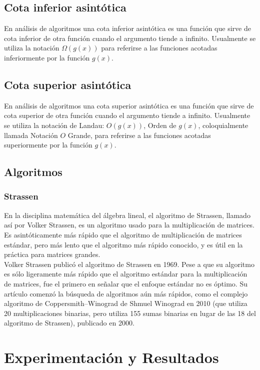 \documentclass[a4paper]{article}
\begin{document}
\subsection{Cota inferior asintótica}
En análisis de algoritmos una cota inferior asintótica es una función que sirve de cota inferior de otra función cuando el argumento tiende a infinito. Usualmente se utiliza la notación $\Omega(g(x))$ para referirse a las funciones acotadas inferiormente por la función $g(x)$.\cite{cota}

\subsection{Cota superior asintótica}
En análisis de algoritmos una cota superior asintótica es una función que sirve de cota superior de otra función cuando el argumento tiende a infinito. Usualmente se utiliza la notación de Landau: $O(g(x))$, Orden de $g(x)$, coloquialmente llamada Notación $O$ Grande, para referirse a las funciones acotadas superiormente por la función $g(x)$.\cite{cota}

\subsection{Algoritmos} 
\subsubsection{Strassen}
En la disciplina matemática del álgebra lineal, el algoritmo de Strassen, llamado así por Volker Strassen, es un algoritmo usado para la multiplicación de matrices. Es asintóticamente más rápido que el algoritmo de multiplicación de matrices estándar, pero más lento que el algoritmo más rápido conocido, y es útil en la práctica para matrices grandes.
\\
Volker Strassen publicó el algoritmo de Strassen en 1969. Pese a que su algoritmo es sólo ligeramente más rápido que el algoritmo estándar para la multiplicación de matrices, fue el primero en señalar que el enfoque estándar no es óptimo. Su artículo comenzó la búsqueda de algoritmos aún más rápidos, como el complejo algoritmo de Coppersmith–Winograd de Shmuel Winograd en 2010 (que utiliza 20 multiplicaciones binarias, pero utiliza 155 sumas binarias en lugar de las 18 del algoritmo de Strassen), publicado en 2000.\cite{matri}

\section{Experimentación y Resultados}
\end{document}
